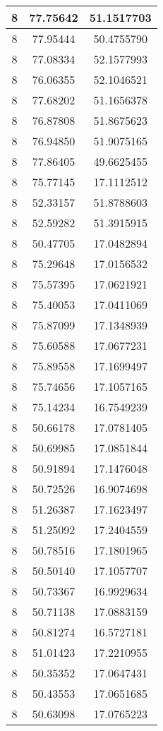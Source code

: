 \documentclass[
]{book}
\begin{document}
\begin{tabular}{c|c|c}
\hline
8 & 77.75642 & 51.1517703\\
\hline
8 & 77.95444 & 50.4755790\\
\hline
8 & 77.08334 & 52.1577993\\
\hline
8 & 76.06355 & 52.1046521\\
\hline
8 & 77.68202 & 51.1656378\\
\hline
8 & 76.87808 & 51.8675623\\
\hline
8 & 76.94850 & 51.9075165\\
\hline
8 & 77.86405 & 49.6625455\\
\hline
8 & 75.77145 & 17.1112512\\
\hline
8 & 52.33157 & 51.8788603\\
\hline
8 & 52.59282 & 51.3915915\\
\hline
8 & 50.47705 & 17.0482894\\
\hline
8 & 75.29648 & 17.0156532\\
\hline
8 & 75.57395 & 17.0621921\\
\hline
8 & 75.40053 & 17.0411069\\
\hline
8 & 75.87099 & 17.1348939\\
\hline
8 & 75.60588 & 17.0677231\\
\hline
8 & 75.89558 & 17.1699497\\
\hline
8 & 75.74656 & 17.1057165\\
\hline
8 & 75.14234 & 16.7549239\\
\hline
8 & 50.66178 & 17.0781405\\
\hline
8 & 50.69985 & 17.0851844\\
\hline
8 & 50.91894 & 17.1476048\\
\hline
8 & 50.72526 & 16.9074698\\
\hline
8 & 51.26387 & 17.1623497\\
\hline
8 & 51.25092 & 17.2404559\\
\hline
8 & 50.78516 & 17.1801965\\
\hline
8 & 50.50140 & 17.1057707\\
\hline
8 & 50.73367 & 16.9929634\\
\hline
8 & 50.71138 & 17.0883159\\
\hline
8 & 50.81274 & 16.5727181\\
\hline
8 & 51.01423 & 17.2210955\\
\hline
8 & 50.35352 & 17.0647431\\
\hline
8 & 50.43553 & 17.0651685\\
\hline
8 & 50.63098 & 17.0765223\\

\end{tabular}
\end{document}
